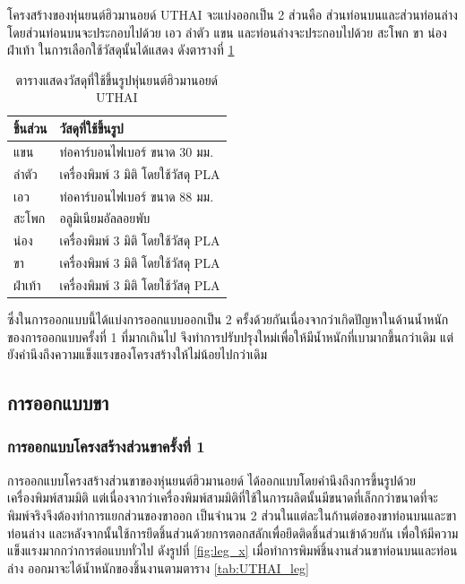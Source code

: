 โครงสร้างของหุ่นยนต์ฮิวมานอยด์ UTHAI จะแบ่งออกเป็น 2 ส่วนคือ ส่วนท่อนบนและส่วนท่อนล่างโดยส่วนท่อนบนจะประกอบไปด้วย 
เอว ลำตัว แขน และท่อนล่างจะประกอบไปด้วย สะโพก ขา น่อง ฝ่าเท้า
ในการเลือกใช้วัสดุนั้นได้แสดง ดังตารางที่ \ref{tab:UTHAI_material_x}

\begin{table}[ht]
	\centering
	\begin{tabular}{| l | l |}
		\hline
		ชิ้นส่วน & วัสดุที่ใช้ขึ้นรูป \\
        \hline
        แขน	& ท่อคาร์บอนไฟเบอร์ ขนาด 30 มม. \\
        ลำตัว & เครื่องพิมพ์ 3 มิติ โดยใช้วัสดุ PLA \\
        เอว	& ท่อคาร์บอนไฟเบอร์ ขนาด 88 มม. \\
        สะโพก & อลูมิเนียมอัลลอยพับ \\
        น่อง & เครื่องพิมพ์ 3 มิติ โดยใช้วัสดุ PLA \\
        ขา & เครื่องพิมพ์ 3 มิติ โดยใช้วัสดุ PLA \\
        ฝ่าเท้า	& เครื่องพิมพ์ 3 มิติ โดยใช้วัสดุ PLA \\
	    \hline
	\end{tabular}
	\caption{ตารางแสดงวัสดุที่ใช้ขึ้นรูปหุ่นยนต์ฮิวมานอยด์ UTHAI}
	\label{tab:UTHAI_material_x}
\end{table}

ซึ่งในการออกแบบนี้ได้แบ่งการออกแบบออกเป็น 2 ครั้งด้วยกันเนื่องจากว่าเกิดปัญหาในด้านน้ำหนักของการออกแบบครั้งที่ 1 ที่มากเกินไป
จึงทำการปรับปรุงใหม่เพื่อให้มีน้ำหนักที่เบามากขึ้นกว่าเดิม แต่ยังคำนึงถึงความแข็งแรงของโครงสร้างให้ไม่น้อยไปกว่าเดิม 
\clearpage
\subsection{การออกแบบขา}
\subsubsection{การออกแบบโครงสร้างส่วนขาครั้งที่ 1}
การออกแบบโครงสร้างส่วนขาของหุ่นยนต์ฮิวมานอยด์ ได้ออกแบบโดยคำนึงถึงการขึ้นรูปด้วยเครื่องพิมพ์สามมิติ 
แต่เนื่องจากว่าเครื่องพิมพ์สามมิติที่ใช้ในการผลิตนั้นมีขนาดที่เล็กกว่าขนาดที่จะพิมพ์จริงจึงต้องทำการแยกส่วนของขาออก
เป็นจำนวน 2 ส่วนในแต่ละในก้านต่อของขาท่อนบนและขาท่อนล่าง และหลังจากนั้นใช้การยึดชิ้นส่วนด้วยการตอกสลักเพื่อยึดติดชิ้นส่วนเข้าด้วยกัน
เพื่อให้มีความแข็งแรงมากกว่าการต่อแบบทั่วไป ดังรูปที่ \ref{fig:leg_x} เมื่อทำการพิมพ์ชิ้นงานส่วนขาท่อนบนและท่อนล่าง
ออกมาจะได้น้ำหนักของชิ้นงานตามตาราง \ref{tab:UTHAI_leg}


